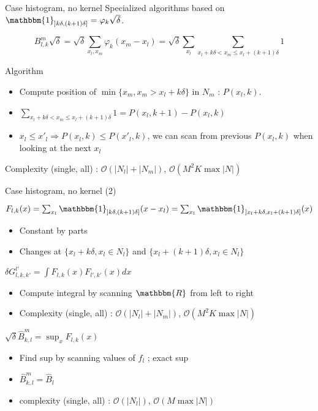 \documentclass{beamer}
\begin{document}
\begin{frame}{Case histogram, no kernel}
    Specialized algorithms based on $\mathbbm{1}_{]k\delta, (k+1)\delta]} = \varphi_k \sqrt{\delta}$.

    \[ B_{l,k}^m \sqrt{\delta} = \sqrt{\delta} \sum_{x_l,x_m} \varphi_k (x_m - x_l) =\sqrt{\delta}  \sum_{x_l} \sum_{x_l + k\delta < x_m \le x_l +(k+1)\delta} 1 \]

    Algorithm
    \begin{itemize}
        \item Compute position of $\min\{x_m,  x_m > x_l + k\delta\}$ in $N_m$ : $P(x_l,k)$.
        \item $\sum_{x_l + k\delta < x_m \le x_l +(k+1)\delta} 1 = P(x_l,k+1) - P(x_l,k)$
        \item $x_l \le x'_l \Rightarrow P(x_l,k) \le P(x'_l, k)$, we can scan from previous $P(x_l,k)$ when looking at the next $x_l$
    \end{itemize}

    Complexity (single, all) : $\mathcal{O}( |N_l| + |N_m| )$, $\mathcal{O}( M^2 K \max|N| )$
\end{frame}

\begin{frame}{Case histogram, no kernel (2)}
    \begin{block}
        {$F_{l,k}(x) = \sum_{x_l} \mathbbm{1}_{]k\delta, (k+1)\delta]} (x - x_l) = \sum_{x_l} \mathbbm{1}_{]x_l + k\delta, x_l + (k+1)\delta]} (x)$}
        \begin{itemize}
            \item Constant by parts
            \item Changes at $\{x_l + k\delta, x_l \in N_l\}$ and $\{x_l + (k+1)\delta, x_l \in N_l\}$
        \end{itemize}
    \end{block}
    \begin{block}
        {$\delta G_{l,k,k'}^{l'} = \int F_{l,k} (x) F_{l',k'}(x) dx$}
         \begin{itemize}
            \item Compute integral by scanning $\mathbbm{R}$ from left to right
            \item Complexity (single, all) : $\mathcal{O}( |N_l| + |N_m| )$, $\mathcal{O}( M^2 K \max|N| )$
        \end{itemize}
    \end{block}
    \begin{block}
        {$\sqrt{\delta} \hat{B}_{k,l}^m = \sup_x F_{l,k} (x)$}
         \begin{itemize}
            \item Find sup by scanning values of $f_l$ ; exact sup
            \item $\hat{B}_{k,l}^m = \hat{B}_l$
            \item complexity (single, all) : $\mathcal{O}( |N_l| )$, $\mathcal{O}( M \max|N| )$
        \end{itemize}
    \end{block}
\end{frame}
\end{document}
